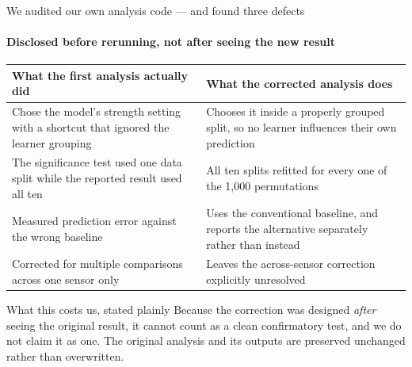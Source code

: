 \documentclass[aspectratio=169,10pt]{beamer}
\begin{document}
\begin{frame}{We audited our own analysis code --- and found three defects}
  \framesubtitle{Disclosed before rerunning, not after seeing the new result}
  \small
  \begin{tabular}{@{}p{}p{}@{}}
    \toprule
    \textbf{What the first analysis actually did} & \textbf{What the corrected
    analysis does} \\
    \midrule
    Chose the model's strength setting with a shortcut that ignored the
    learner grouping
      & Chooses it inside a properly grouped split, so no learner influences
        their own prediction \\
    The significance test used one data split while the reported result used
    all ten
      & All ten splits refitted for every one of the 1{,}000 permutations \\
    Measured prediction error against the wrong baseline
      & Uses the conventional baseline, and reports the alternative
        separately rather than instead \\
    Corrected for multiple comparisons across one sensor only
      & Leaves the across-sensor correction explicitly unresolved \\
    \bottomrule
  \end{tabular}

  \vspace{0.7em}
  \begin{block}{What this costs us, stated plainly}
    Because the correction was designed \emph{after} seeing the original
    result, it cannot count as a clean confirmatory test, and we do not claim
    it as one. The original analysis and its outputs are preserved unchanged
    rather than overwritten.
  \end{block}
\end{frame}
\end{document}

